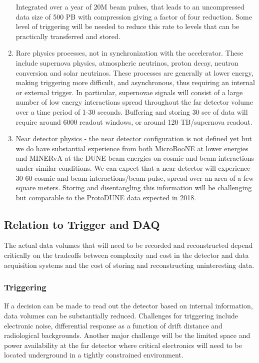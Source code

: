 \begin{enumerate}
Integrated over a year of 20M beam pulses, that leads to an uncompressed data size of 500 PB with compression giving a factor of four reduction. Some level of triggering will be needed to reduce this rate to levels that can be practically transferred and stored.


\item Rare physics processes, not in synchronization with the accelerator.  These include supernova physics, atmospheric neutrinos, proton decay, neutron conversion and solar neutrinos.  These processes are generally at lower energy, making triggering more difficult, and asynchronous, thus requiring an internal or external trigger.  In particular, supernovae signals will consist of a large number of low energy interactions spread throughout the far detector volume over a time period of 1-30 seconds. Buffering and storing 30 sec of data will require around 6000 readout windows, or around 120 TB/supernova readout.  

\item Near detector physics - the near detector configuration is not defined yet but we do have substantial experience from both MicroBooNE at lower energies and MINERvA at the DUNE beam energies on cosmic and beam interactions under similar conditions.  We can expect that a near detector will experience 30-60 cosmic and beam interactions/beam pulse, spread over an area of a few square meters.  Storing and disentangling this information will be challenging but comparable to the ProtoDUNE data expected in 2018.
\end{enumerate}


\subsection{Relation to Trigger and DAQ}

The actual data volumes that will need to be recorded and reconstructed depend critically on the tradeoffs between complexity and cost in the detector and data acquisition systems and the cost of storing and reconstructing uninteresting data.

\subsubsection{Triggering}

If a decision can be made to read  out the detector based on internal information, data volumes can be substantially reduced.  
Challenges for triggering include electronic noise, differential response as a function of drift distance and radiological backgrounds.
Another major challenge will be the limited space and power availability at the far detector where critical electronics will need to be located underground in a tightly constrained environment.

